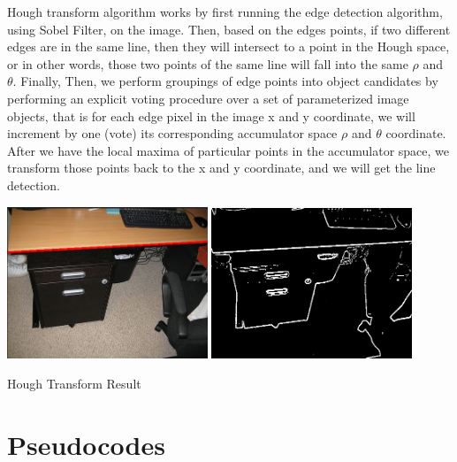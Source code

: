 \documentclass{article}
\begin{document}
         Hough transform algorithm works by first running the edge detection algorithm, using Sobel Filter, on the image. Then, based on the edges points, if two different edges are in the same line, then they will intersect to a point in the Hough space, or in other words, those two points of the same line will fall into the same $\rho$ and $\theta$. Finally, Then, we perform groupings of edge points into object candidates by performing an explicit voting procedure over a set of parameterized image objects, that is for each edge pixel in the image x and y coordinate, we will increment by one (vote) its corresponding accumulator space $\rho$ and $\theta$ coordinate. After we have the local maxima of particular points in the accumulator space, we transform those points back to the x and y coordinate, and we will get the line detection.
         \begin{center}
        \includegraphics[width=0.45\textwidth]{source/images/unknown.png}
        \includegraphics[width=0.45\textwidth]{source/images/testOutputEdge5.JPEG}
        
        \caption{Hough Transform Result}
        \end{center}
         
\section{Pseudocodes}
\end{document}
